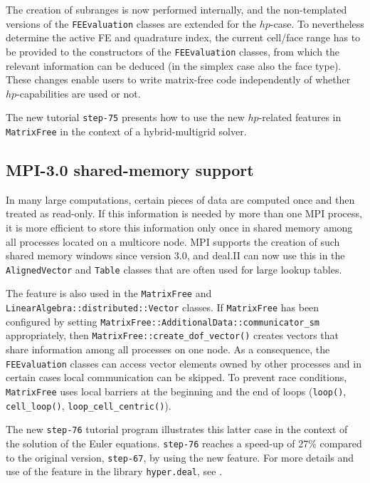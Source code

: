 \documentclass{ansarticle-preprint}
\begin{document}
The creation of subranges is now performed internally, and the non-templated versions
of the \texttt{FEEvaluation} classes are extended for the $hp$-case. To nevertheless determine
the active FE and quadrature index, the current cell/face range has to be provided
to the constructors of the \texttt{FEEvaluation} classes, from which the relevant information
can be deduced (in the simplex case also the face type). These changes enable
users to write matrix-free code independently of whether $hp$-capabilities are used or not.

The new tutorial \texttt{step-75} presents how to use the new $hp$-related features in \texttt{MatrixFree}
in the context of a hybrid-multigrid solver.



\subsection{MPI-3.0 shared-memory support}
In many large computations, certain pieces of data are computed once
and then treated as read-only. If this information is needed by more
than one MPI process, it is more efficient to store this information only
once in shared memory among all processes located on a multicore
node. MPI supports the creation of such shared memory windows since
version 3.0, and deal.II can now use this in the
\texttt{AlignedVector} and \texttt{Table} classes that are often used
for large lookup tables.

The feature is also used in the \texttt{MatrixFree} and
\texttt{LinearAlgebra::\allowbreak distributed::\allowbreak Vector} classes. If \texttt{MatrixFree} has been configured by setting
\texttt{MatrixFree::AdditionalData::communicator\_sm} appropriately, then
\texttt{MatrixFree::create\_dof\_vector()} creates vectors that share
information among all processes on one node. As a consequence, the
\texttt{FEEvaluation} classes can access vector elements owned by
other processes and in certain cases local
communication can be skipped. To prevent race conditions, \texttt{MatrixFree} uses local
barriers at the beginning and the end of loops (\texttt{loop()}, \texttt{cell\_loop()}, \texttt{loop\_cell\_centric()}).

The new \texttt{step-76} tutorial program illustrates this latter case
in the context of the solution of the Euler equations. \texttt{step-76} reaches a
speed-up of 27\% compared to the 
original version, \texttt{step-67}, by using the new feature.
For more details and use of the feature in the library \texttt{hyper.deal}, see \citep{munch2020hyperdeal}.
\end{document}
